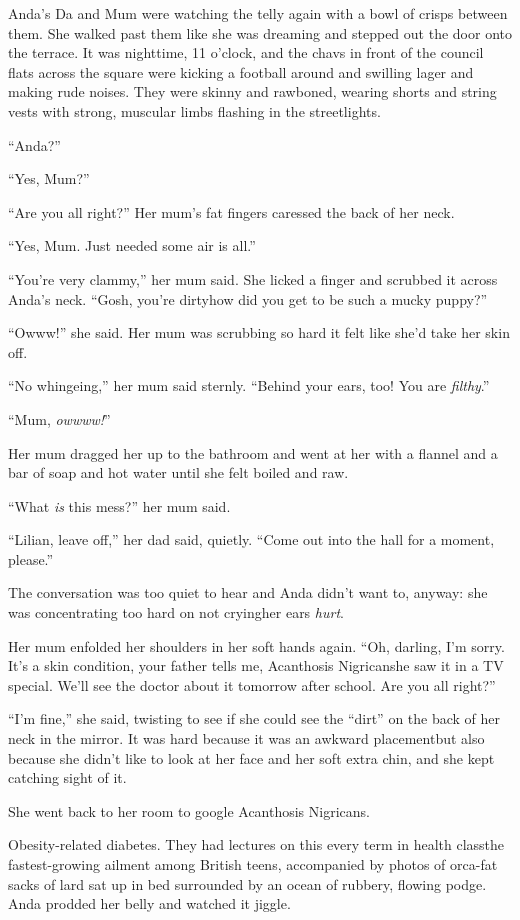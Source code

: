 Anda’s Da and Mum were watching the telly again with a bowl of
crisps between them. She walked past them like she was dreaming and
stepped out the door onto the terrace. It was nighttime, 11
o’clock, and the chavs in front of the council flats across the
square were kicking a football around and swilling lager and making
rude noises. They were skinny and rawboned, wearing shorts and
string vests with strong, muscular limbs flashing in the
streetlights.

“Anda?”

“Yes, Mum?”

“Are you all right?” Her mum’s fat fingers caressed the back of her
neck.

“Yes, Mum. Just needed some air is all.”

“You’re very clammy,” her mum said. She licked a finger and
scrubbed it across Anda’s neck. “Gosh, you’re dirty\dash{}how did you get
to be such a mucky puppy?”

“Owww!” she said. Her mum was scrubbing so hard it felt like she’d
take her skin off.

“No whingeing,” her mum said sternly. “Behind your ears, too! You
are \emph{filthy}.”

“Mum, \emph{owwww!}”

Her mum dragged her up to the bathroom and went at her with a
flannel and a bar of soap and hot water until she felt boiled and
raw.

“What \emph{is} this mess?” her mum said.

“Lilian, leave off,” her dad said, quietly. “Come out into the hall
for a moment, please.”

The conversation was too quiet to hear and Anda didn’t want to,
anyway: she was concentrating too hard on not crying\dash{}her ears
\emph{hurt}.

Her mum enfolded her shoulders in her soft hands again. “Oh,
darling, I’m sorry. It’s a skin condition, your father tells me,
Acanthosis Nigricans\dash{}he saw it in a TV special. We’ll see the
doctor about it tomorrow after school. Are you all right?”

“I’m fine,” she said, twisting to see if she could see the “dirt”
on the back of her neck in the mirror. It was hard because it was
an awkward placement\dash{}but also because she didn’t like to look at
her face and her soft extra chin, and she kept catching sight of
it.

She went back to her room to google Acanthosis Nigricans.

Obesity-related diabetes. They had lectures on this every term in
health class\dash{}the fastest-growing ailment among British teens,
accompanied by photos of orca-fat sacks of lard sat up in bed
surrounded by an ocean of rubbery, flowing podge. Anda prodded her
belly and watched it jiggle.

